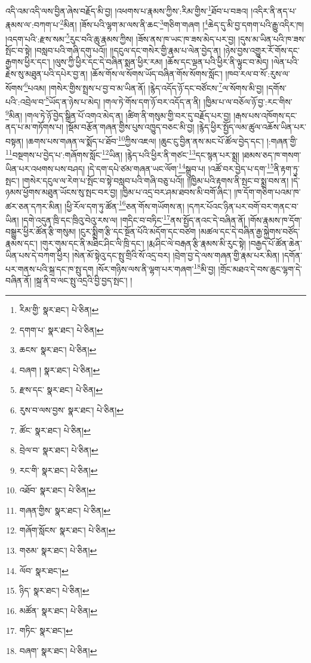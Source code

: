 འདི་འམ་འདི་ལས་བྱིན་ཞེས་བརྗོད་མི་བྱ། །འཕགས་པ་རྣམས་ཀྱིས་:རིམ་གྱིས་\footnote{རིམ་གྱི་  སྣར་ཐང་།  པེ་ཅིན། }ཐོབ་པ་བཟའ། །འདིར་ནི་ནད་པ་རྣམས་ལ་:བཀག་པ་\footnote{དགག་པ་  སྣར་ཐང་།  པེ་ཅིན། }མིན། །ཟོས་པའི་ལྷག་མ་ལས་ནི་ཆང་\footnote{ཆངས་  སྣར་ཐང་།  པེ་ཅིན། }གཅིག་གཞག །\footnote{བཞག །  སྣར་ཐང་།  པེ་ཅིན། }ཆེད་དུ་མི་བྱ་དགག་པའི་རྒྱུ་འདིར་ཁ། །འདག་པའི་:རྫས་སམ་\footnote{རྫས་དང་  སྣར་ཐང་།  པེ་ཅིན། }རུང་བའི་ཆུ་རྣམས་ཀྱིས། །ཟོས་ནས་ཁ་ཡང་ཁ་ཟས་མེད་པར་བྱ། །དུས་མ་ཡིན་པའི་ཁ་ཟས་སྤོང་བ་སྟེ། །བསླབ་པའི་གཞི་དགུ་པའོ།། །།དངུལ་དང་གསེར་གྱི་རྣམ་པ་ལེན་བྱེད་ན། །ཉེས་བྱས་འགྱུར་རོ་གོས་དང་རྒྱགས་ཕྱིར་དང་། །ལུས་ཀྱི་ཕྱིར་དང་དེ་བཞིན་སྨན་ཕྱིར་རམ། །ཆོས་དང་ལྡན་པའི་ཕྱིར་ནི་ལྟུང་བ་མེད། །ལེན་པའི་རྗེས་སུ་མཐུན་པའི་དཔེར་བྱ་ན། །ཆོས་གོས་ལ་སོགས་ཡོད་བཞིན་གོས་སོགས་སློང་། །ཁབ་རལ་བ་སོ་:རུས་ལ་སོགས་\footnote{རུས་བ་ལས་བྱས་  སྣར་ཐང་།  པེ་ཅིན། }པའམ། །གསེར་གྱིས་སྤྲས་པ་བྱ་བ་མ་ཡིན་ནོ། །རྙེད་འདོད་ཉོ་དང་བཙོངས་\footnote{ཚོང་  སྣར་ཐང་།  པེ་ཅིན། }ལ་སོགས་མི་བྱ། །དགོས་པའི་:འབྲེལ་བ་\footnote{བྲེལ་བ་  སྣར་ཐང་།  པེ་ཅིན། }ཡོད་ན་ཉེས་པ་མེད། །གལ་ཏེ་གོས་དག་ཉོ་བར་འདོད་ན་ནི། །ཁྱིམ་པ་ལ་བཅོལ་ཉོ་བྱ་:རང་གིས་\footnote{རང་གི་  སྣར་ཐང་།  པེ་ཅིན། }མིན། །གལ་ཏེ་ཉོ་བྱེད་སྒྲིན་པོ་འགའ་མེད་ན། །ཚིག་ནི་གསུམ་གྱི་བར་དུ་བརྗོད་པར་བྱ། །རྒས་པས་འཁོགས་དང་ནད་པ་མ་གཏོགས་པ། །སྡོམ་བརྩོན་གཞན་གྱིས་པུས་འཁྱུད་བཅང་མི་བྱ། །རྙེད་ཕྱིར་སྤྱོད་ལམ་ཚུལ་འཆོས་ཡིན་པར་བསྟན། །ཆགས་པས་གཞན་ལ་སྨོད་པ་ཐོབ་\footnote{འཐོབ་  སྣར་ཐང་།  པེ་ཅིན། }ཀྱིས་འཇལ། །ཆུང་ངུ་བྱིན་ནས་མང་པོ་ཚོལ་བྱེད་དང་། །:གཞན་གྱི་\footnote{གཞན་གྱིས་  སྣར་ཐང་།  པེ་ཅིན། }བསྔགས་པ་བྱེད་པ་:གཞོགས་སློང་\footnote{གཞོག་སློངས་  སྣར་ཐང་།  པེ་ཅིན། }ཡིན། །རྙེད་པའི་ཕྱིར་ནི་གཙང་\footnote{གཅམ་  སྣར་ཐང་།  པེ་ཅིན། }དང་སྙན་པར་སྨྲ། །ཐམས་ཅད་ཁ་གསག་ཡིན་པར་འཕགས་པས་བཤད། །དེ་དག་དཔེ་ཙམ་གཞན་ཡང་ལོག་\footnote{ལོབ་  སྣར་ཐང་། }སྒྲུབ་པ། །འཚོ་བར་བྱེད་པ་དག་\footnote{ཉིད་  སྣར་ཐང་།  པེ་ཅིན། }ནི་རྟག་ཏུ་སྤང་། །གསེར་དངུལ་ལ་རེག་པ་སྤོང་བ་སྟེ་བསླབ་པའི་གཞི་བཅུ་པའོ།། །།ཁྱིམ་པའི་རྟགས་ནི་སྤང་བ་སྨྲ་བས་ན། །དེ་ཉམས་ཕྱོགས་མཐུན་ཡོངས་སུ་སྤང་བར་བྱ། །ཁྱིམ་པ་འདྲ་བར་ཤམ་ཐབས་མི་བགོ་ཞིང་། །ཁ་དོག་གཅིག་པའམ་ཁ་ཚར་ཅན་དཀར་མིན། །ཕྱི་རོལ་དག་ཏུ་ཚོན་\footnote{མཚོན་  སྣར་ཐང་།  པེ་ཅིན། }ཅན་གོས་གཡོགས་ན། །དཀར་པོའང་ཉིན་པར་བགོ་བར་གནང་བ་ཡིན། །དགེ་འདུན་ཁྲི་དང་ཁྲིའུ་བེའུ་རས་ལ། །གདིང་བ་བཏིང་\footnote{གཏིང་  སྣར་ཐང་། }ནས་སྤྱོད་ནའང་དེ་བཞིན་ནོ། །གོས་རྣམས་ཁ་དོག་བསྒྱུར་ཕྱིར་ཚོན་རྩི་གསུམ། །ངུར་སྨྲིག་རྩི་དང་སྔོན་པོའི་མདོག་དང་བཙག །མཚལ་དང་དེ་བཞིན་རྒྱ་སྐྱེགས་བཙོད་རྣམས་དང་། །གུར་གུམ་དང་ནི་མཐིང་ཤིང་ལི་ཁྲི་དང་། །རྨ་ཤིང་ལེ་བརྒན་རྩི་རྣམས་མི་རུང་སྟེ། །བརྒྱད་པོ་ཚོན་ཆེན་ཡིན་པས་དེ་བཀག་ཕྱིར། །སེན་མོ་སྟེའུ་དང་སྤུ་གྲིའི་སོ་འདྲ་བར། །བྲེག་བྱ་དེ་ལས་གཞན་གྱི་རྣམ་པར་མིན། །དགོན་པར་གནས་པའི་སྐྲ་དང་ཁ་སྤུ་དག །སོར་གཉིས་ལས་ནི་ལྷག་པར་གཞག་\footnote{བཞག་  སྣར་ཐང་།  པེ་ཅིན། }མི་བྱ། །གྲོང་མཐའ་དེ་བས་ཆུང་ལྷག་དེ་བཞིན་ནོ། །སྐྲ་ནི་བ་ལང་སྤུ་འདྲའི་བྱི་བྱད་སྤང་། །

